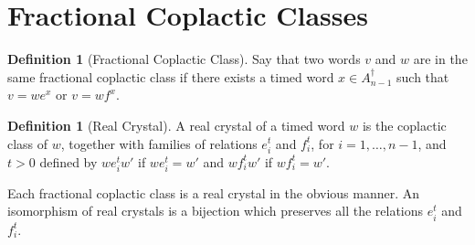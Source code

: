 \documentclass[12pt]{amsproc}
\theoremstyle{definition}
\newtheorem{definition}[theorem]{Definition}
\begin{document}
\section{Fractional Coplactic Classes}
\label{sec:fract-copl-class}
\begin{definition}[Fractional Coplactic Class]
  Say that two words $v$ and $w$ are in the same fractional coplactic class if there exists a timed word $x\in A_{n-1}^\dagger$ such that $v=we^x$ or $v=wf^x$.
\end{definition}
\begin{definition}[Real Crystal]
  A real crystal of a timed word $w$ is the coplactic class of $w$, together with families of relations $e_i^t$ and $f_i^t$, for $i=1,\dotsc,n-1$, and $t>0$ defined by $we_i^t w'$ if $we_i^t = w'$ and $wf_i^tw'$ if $wf_i^t=w'$.
\end{definition}
Each fractional coplactic class is a real crystal in the obvious manner.
An isomorphism of real crystals is a bijection which preserves all the relations $e_i^t$ and $f_i^t$.
\end{document}
